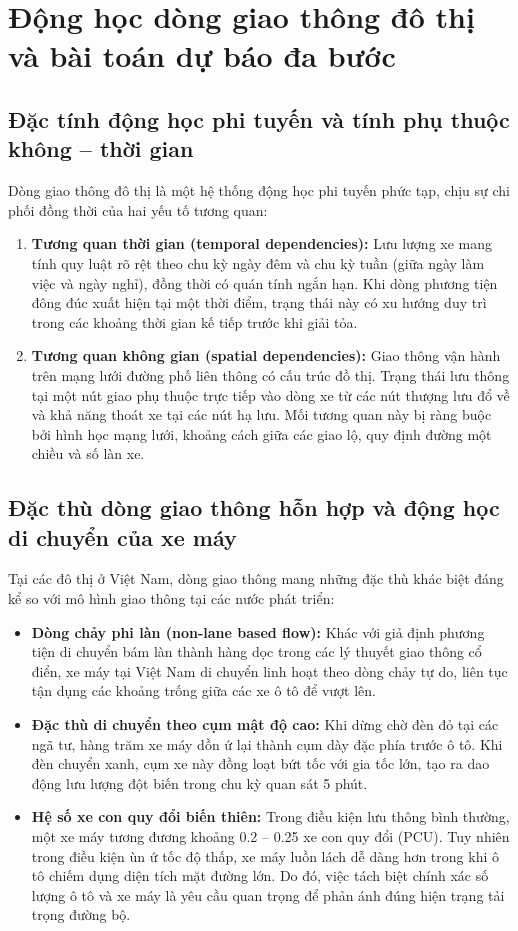 \section{Động học dòng giao thông đô thị và bài toán dự báo đa bước}
\subsection{Đặc tính động học phi tuyến và tính phụ thuộc không -- thời gian}
Dòng giao thông đô thị là một hệ thống động học phi tuyến phức tạp, chịu sự chi phối đồng thời của hai yếu tố tương quan:
\begin{enumerate}
    \item \textbf{Tương quan thời gian (temporal dependencies):} Lưu lượng xe mang tính quy luật rõ rệt theo chu kỳ ngày đêm và chu kỳ tuần (giữa ngày làm việc và ngày nghỉ), đồng thời có quán tính ngắn hạn. Khi dòng phương tiện đông đúc xuất hiện tại một thời điểm, trạng thái này có xu hướng duy trì trong các khoảng thời gian kế tiếp trước khi giải tỏa.
    \item \textbf{Tương quan không gian (spatial dependencies):} Giao thông vận hành trên mạng lưới đường phố liên thông có cấu trúc đồ thị. Trạng thái lưu thông tại một nút giao phụ thuộc trực tiếp vào dòng xe từ các nút thượng lưu đổ về và khả năng thoát xe tại các nút hạ lưu. Mối tương quan này bị ràng buộc bởi hình học mạng lưới, khoảng cách giữa các giao lộ, quy định đường một chiều và số làn xe.
\end{enumerate}

\subsection{Đặc thù dòng giao thông hỗn hợp và động học di chuyển của xe máy}
Tại các đô thị ở Việt Nam, dòng giao thông mang những đặc thù khác biệt đáng kể so với mô hình giao thông tại các nước phát triển:
\begin{itemize}
    \item \textbf{Dòng chảy phi làn (non-lane based flow):} Khác với giả định phương tiện di chuyển bám làn thành hàng dọc trong các lý thuyết giao thông cổ điển, xe máy tại Việt Nam di chuyển linh hoạt theo dòng chảy tự do, liên tục tận dụng các khoảng trống giữa các xe ô tô để vượt lên.
    \item \textbf{Đặc thù di chuyển theo cụm mật độ cao:} Khi dừng chờ đèn đỏ tại các ngã tư, hàng trăm xe máy dồn ứ lại thành cụm dày đặc phía trước ô tô. Khi đèn chuyển xanh, cụm xe này đồng loạt bứt tốc với gia tốc lớn, tạo ra dao động lưu lượng đột biến trong chu kỳ quan sát 5 phút.
    \item \textbf{Hệ số xe con quy đổi biến thiên:} Trong điều kiện lưu thông bình thường, một xe máy tương đương khoảng 0.2 -- 0.25 xe con quy đổi (PCU). Tuy nhiên trong điều kiện ùn ứ tốc độ thấp, xe máy luồn lách dễ dàng hơn trong khi ô tô chiếm dụng diện tích mặt đường lớn. Do đó, việc tách biệt chính xác số lượng ô tô và xe máy là yêu cầu quan trọng để phản ánh đúng hiện trạng tải trọng đường bộ.
\end{itemize}

